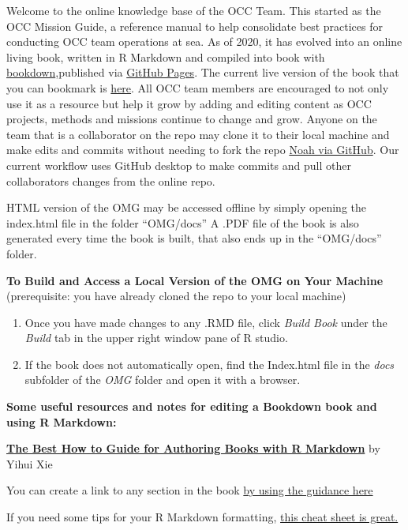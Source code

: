 \documentclass[
]{book}
\providecommand{\tightlist}{%
  \setlength{\itemsep}{0pt}\setlength{\parskip}{0pt}}
\begin{document}
Welcome to the online knowledge base of the OCC Team. This started as the OCC Mission Guide, a reference manual to help consolidate best practices for conducting OCC team operations at sea. As of 2020, it has evolved into an online living book, written in R Markdown and compiled into book with \href{https://bookdown.org/yihui/bookdown/}{bookdown},published via \href{https://pages.github.com/}{GitHub Pages}. The current live version of the book that you can bookmark is \href{https://npomeroy.github.io/OMG/}{here}. All OCC team members are encouraged to not only use it as a resource but help it grow by adding and editing content as OCC projects, methods and missions continue to change and grow. Anyone on the team that is a collaborator on the repo may clone it to their local machine and make edits and commits without needing to fork the repo \href{https://github.com/npomeroy/OMG}{Noah via GitHub}. Our current workflow uses GitHub desktop to make commits and pull other collaborators changes from the online repo.

HTML version of the OMG may be accessed offline by simply opening the index.html file in the folder ``OMG/docs'' A .PDF file of the book is also generated every time the book is built, that also ends up in the ``OMG/docs'' folder.

\textbf{To Build and Access a Local Version of the OMG on Your Machine}
(prerequisite: you have already cloned the repo to your local machine)

\begin{enumerate}
\def\labelenumi{\arabic{enumi}.}
\tightlist
\item
  Once you have made changes to any .RMD file, click \emph{Build Book} under the \emph{Build} tab in the upper right window pane of R studio.
\item
  If the book does not automatically open, find the Index.html file in the \emph{docs} subfolder of the \emph{OMG} folder and open it with a browser.
\end{enumerate}

\textbf{Some useful resources and notes for editing a Bookdown book and using R Markdown:}

\href{https://bookdown.org/yihui/bookdown/}{\textbf{The Best How to Guide for Authoring Books with R Markdown}} by Yihui Xie

You can create a link to any section in the book \href{https://bookdown.org/yihui/bookdown/cross-references.html}{by using the guidance here}

If you need some tips for your R Markdown formatting, \href{https://rmarkdown.rstudio.com/lesson-15.html}{this cheat sheet is great.}
\end{document}
